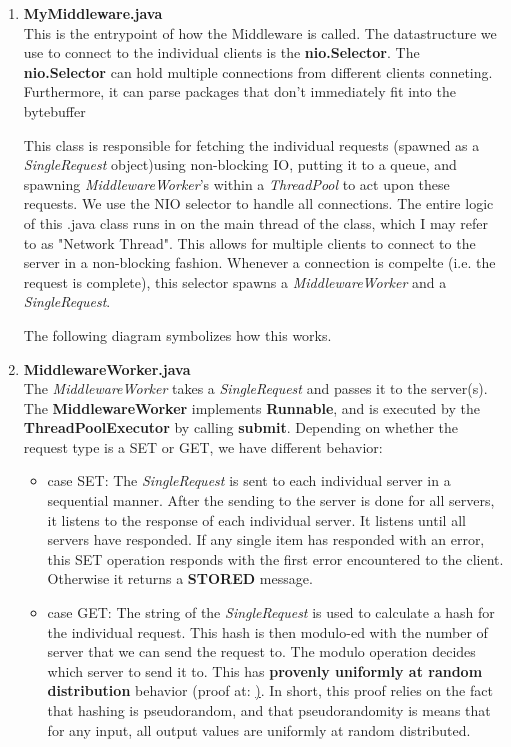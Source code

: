 \documentclass[11pt,a4paper]{article}
\begin{document}
\begin{enumerate}
\begin{enumerate}
\item \textbf{MyMiddleware.java} \\
This is the entrypoint of how the Middleware is called.
The datastructure we use to connect to the individual clients is the \textbf{nio.Selector}. 
The \textbf{nio.Selector} can hold multiple connections from different clients conneting. 
Furthermore, it can parse packages that don't immediately fit into the bytebuffer 

This class is responsible for fetching the individual requests (spawned as a \textit{SingleRequest} object)using non-blocking IO, putting it to a queue, and spawning \textit{MiddlewareWorker}'s within a \textit{ThreadPool} to act upon these requests.
We use the NIO selector to handle all connections.
The entire logic of this .java class runs in on the main thread of the class, which I may refer to as "Network Thread".
This allows for multiple clients to connect to the server in a non-blocking fashion.
Whenever a connection is compelte (i.e. the request is complete), this selector spawns a \textit{MiddlewareWorker} and a \textit{SingleRequest}.

The following diagram symbolizes how this works.

\item \textbf{MiddlewareWorker.java} \\
The \textit{MiddlewareWorker} takes a \textit{SingleRequest} and passes it to the server(s). 
The \textbf{MiddlewareWorker} implements \textbf{Runnable}, and is executed by the \textbf{ThreadPoolExecutor} by calling \textbf{submit}.
Depending on whether the request type is a SET or GET, we have different behavior:

\begin{itemize}
\item case SET: 
The \textit{SingleRequest} is sent to each individual server in a sequential manner.
After the sending to the server is done for all servers, it listens to the response of each individual server.
It listens until all servers have responded.
If any single item has responded with an error, this SET operation responds with the first error encountered to the client.
Otherwise it returns a \textbf{STORED} message. 

\item case GET: 
The string of the \textit{SingleRequest} is used to calculate a hash for the individual request.
This hash is then modulo-ed with the number of server that we can send the request to.
The modulo operation decides which server to send it to.
This has \textbf{provenly uniformly at random distribution}  behavior (proof at: \href{https://eprint.iacr.org/2016/985.pdf, https://en.wikipedia.org/wiki/K-independent_hashing, https://www.akamai.com/es/es/multimedia/documents/technical-publication/consistent-hashing-and-random-trees-distributed-caching-protocols-for-relieving-hot-spots-on-the-world-wide-web-technical-publication.pdf}).
In short, this proof relies on the fact that hashing is pseudorandom, and that pseudorandomity is means that for any input, all output values are uniformly at random distributed.


\end{itemize}
\end{enumerate}
\end{enumerate}
\end{document}
